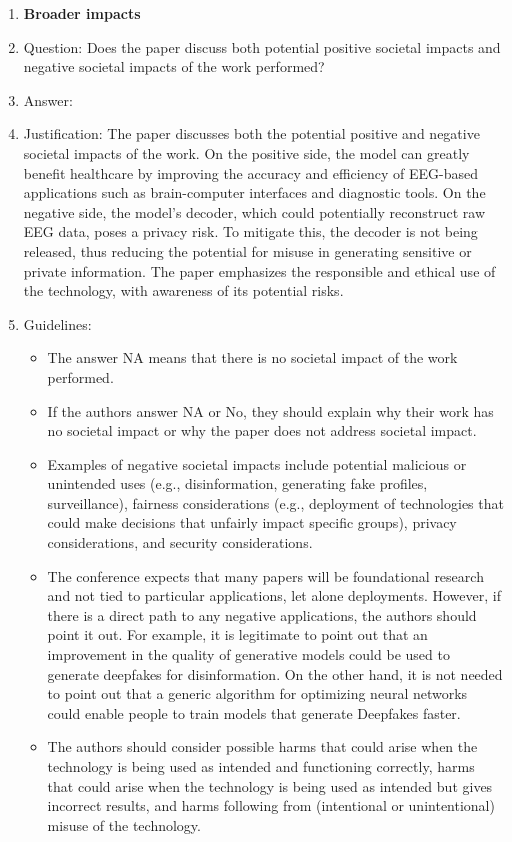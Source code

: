 \documentclass{article}
\begin{document}
\begin{enumerate}
\item {\bf Broader impacts}
    \item[] Question: Does the paper discuss both potential positive societal impacts and negative societal impacts of the work performed?
    \item[] Answer: \answerYes{} %
    \item[] Justification: The paper discusses both the potential positive and negative societal impacts of the work. On the positive side, the model can greatly benefit healthcare by improving the accuracy and efficiency of EEG-based applications such as brain-computer interfaces and diagnostic tools. On the negative side, the model's decoder, which could potentially reconstruct raw EEG data, poses a privacy risk. To mitigate this, the decoder is not being released, thus reducing the potential for misuse in generating sensitive or private information. The paper emphasizes the responsible and ethical use of the technology, with awareness of its potential risks.
    \item[] Guidelines:
    \begin{itemize}
        \item The answer NA means that there is no societal impact of the work performed.
        \item If the authors answer NA or No, they should explain why their work has no societal impact or why the paper does not address societal impact.
        \item Examples of negative societal impacts include potential malicious or unintended uses (e.g., disinformation, generating fake profiles, surveillance), fairness considerations (e.g., deployment of technologies that could make decisions that unfairly impact specific groups), privacy considerations, and security considerations.
        \item The conference expects that many papers will be foundational research and not tied to particular applications, let alone deployments. However, if there is a direct path to any negative applications, the authors should point it out. For example, it is legitimate to point out that an improvement in the quality of generative models could be used to generate deepfakes for disinformation. On the other hand, it is not needed to point out that a generic algorithm for optimizing neural networks could enable people to train models that generate Deepfakes faster.
        \item The authors should consider possible harms that could arise when the technology is being used as intended and functioning correctly, harms that could arise when the technology is being used as intended but gives incorrect results, and harms following from (intentional or unintentional) misuse of the technology.

\end{itemize}
\end{enumerate}
\end{document}
